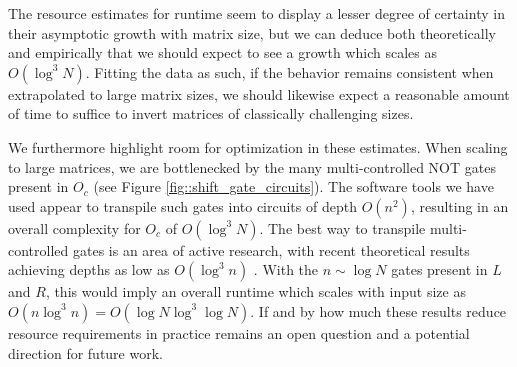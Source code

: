 \documentclass[10pt, twocolumn]{article}
\begin{document}
The resource estimates for runtime seem to display a lesser degree of certainty in their asymptotic growth with matrix size, but we can deduce both theoretically and empirically that we should expect to see a growth which scales as $O(\log^3{N})$. Fitting the data as such, if the behavior remains consistent when extrapolated to large matrix sizes, we should likewise expect a reasonable amount of time to suffice to invert matrices of classically challenging sizes.

We furthermore highlight room for optimization in these estimates. When scaling to large matrices, we are bottlenecked by the many multi-controlled \textsc{NOT} gates present in $O_c$ (see Figure \ref{fig::shift_gate_circuits}). The software tools we have used appear to transpile such gates into circuits of depth $O(n^2)$, resulting in an overall complexity for $O_c$ of $O(\log^3{N})$. The best way to transpile multi-controlled gates is an area of active research, with recent theoretical results achieving depths as low as $O(\log^3{n})$ \cite{claudon2024polylogarithmic}. With the $n \sim \log{N}$ gates present in $L$ and $R$, this would imply an overall runtime which scales with input size as $O(n \log^3{n}) = O(\log{N} \log^3{\log{N}} )$. If and by how much these results reduce resource requirements in practice remains an open question and a potential direction for future work.

\printbibliography
\end{document}
